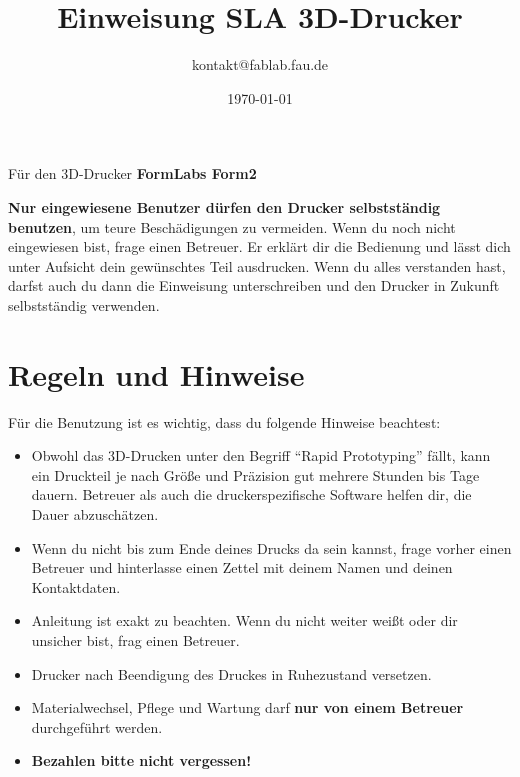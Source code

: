 \documentclass{\basedir/fablab-document}
\date{\today}
\author{kontakt@fablab.fau.de}
\title{Einweisung SLA 3D-Drucker}
\begin{document}
	
	\maketitle
	\begin{center}
		Für den 3D-Drucker \textbf{FormLabs Form2}
	\end{center}
	
	\textbf{Nur eingewiesene Benutzer dürfen den Drucker selbstständig benutzen}, um teure Beschädigungen zu vermeiden. Wenn du noch nicht eingewiesen bist, frage einen Betreuer. Er erklärt dir die Bedienung und lässt dich unter Aufsicht dein gewünschtes Teil ausdrucken. Wenn du alles verstanden hast, darfst auch du dann die Einweisung unterschreiben und den Drucker in Zukunft selbstständig verwenden.
	
	\section{Regeln und Hinweise}
	Für die Benutzung ist es wichtig, dass du folgende Hinweise beachtest:
	
	\begin{itemize}
		\item Obwohl das 3D-Drucken unter den Begriff ``Rapid Prototyping'' fällt, kann ein Druckteil je nach Größe und
		Präzision gut mehrere Stunden bis Tage dauern. Betreuer als auch die druckerspezifische Software helfen dir, die Dauer abzuschätzen.
		\item Wenn du nicht bis zum Ende deines Drucks da sein kannst, frage vorher einen Betreuer und hinterlasse einen Zettel mit deinem Namen und deinen Kontaktdaten.
		\item Anleitung ist exakt zu beachten. Wenn du nicht weiter weißt oder dir unsicher bist, frag einen Betreuer.
		\item Drucker nach Beendigung des Druckes in Ruhezustand versetzen.
		\item Materialwechsel, Pflege und Wartung darf \textbf{nur von einem Betreuer} durchgeführt werden.
		\item \textbf{Bezahlen bitte nicht vergessen!}
	\end{itemize}
\newpage
\end{document}
